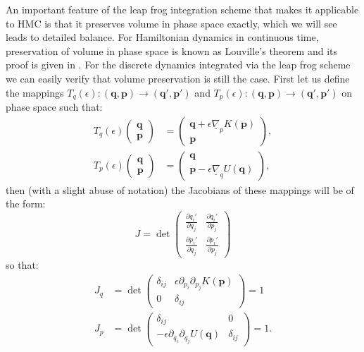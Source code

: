 \documentclass[12pt]{article}
\begin{document}
            An important feature of the leap frog integration scheme that makes it applicable to HMC is that it preserves volume in phase space exactly, which we will see leads to detailed balance. For Hamiltonian dynamics in continuous time, preservation of volume in phase space is known as Louville's theorem and its proof is given in \cite{goldstein_poole_safko_2014}. For the discrete dynamics integrated via the leap frog scheme we can easily verify that volume preservation is still the case. First let us define the mappings $T_q\left(\epsilon\right): \left(\bm{q},\bm{p}\right) \rightarrow \left(\bm{q}',\bm{p}'\right) $ and $T_p\left(\epsilon\right): \left(\bm{q},\bm{p}\right) \rightarrow \left(\bm{q}',\bm{p}'\right)$ on phase space such that:
            \begin{align}
                \label{eq:psMap1}
                T_q\left(\epsilon\right)\begin{pmatrix} \bm{q} \\ \bm{p} \end{pmatrix} & = \begin{pmatrix} \bm{q} +\epsilon \underline{\nabla}_pK\left(\bm{p}\right) \\ \bm{p} \end{pmatrix}, \\
                \label{eq:psMap2}
                T_p\left(\epsilon\right)\begin{pmatrix} \bm{q} \\ \bm{p} \end{pmatrix} & = \begin{pmatrix} \bm{q} \\ \bm{p} - \epsilon \underline{\nabla}_qU\left(\bm{q}\right) \end{pmatrix},
            \end{align}
            then (with a slight abuse of notation) the Jacobians of these mappings will be of the form:
            \begin{equation}
                J = \det\begin{pmatrix}\frac{\partial q_i'}{\partial q_j} & \frac{\partial q_i'}{\partial p_j} \\ \frac{\partial p_i'}{\partial q_j} & \frac{\partial p_i'}{\partial p_j} \end{pmatrix}
            \end{equation}
            so that:
            \begin{align}
            J_q& =\det\begin{pmatrix} \delta_{ij} & \epsilon\partial_{p_i}\partial_{p_j}K\left(\bm{p}\right) \\ 0 & \delta_{ij} \end{pmatrix} = 1 \\
            J_p& =\det\begin{pmatrix} \delta_{ij} &  0  \\ -\epsilon\partial_{q_i}\partial_{q_j}U\left(\bm{q}\right) & \delta_{ij} \end{pmatrix} = 1.
            \end{align}
\end{document}
